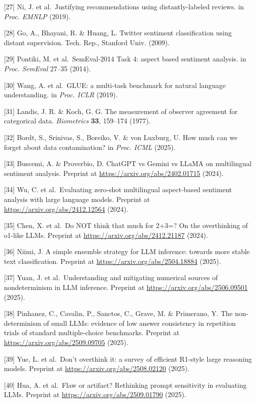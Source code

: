 \documentclass[11pt]{article}
\begin{document}
{[}27{]} Ni, J. et al.~Justifying recommendations using
distantly-labeled reviews. in \emph{Proc. EMNLP} (2019).

{[}28{]} Go, A., Bhayani, R. \& Huang, L. Twitter sentiment
classification using distant supervision. Tech. Rep., Stanford Univ.
(2009).

{[}29{]} Pontiki, M. et al.~SemEval-2014 Task 4: aspect based sentiment
analysis. in \emph{Proc. SemEval} 27--35 (2014).

{[}30{]} Wang, A. et al.~GLUE: a multi-task benchmark for natural
language understanding. in \emph{Proc. ICLR} (2019).

{[}31{]} Landis, J. R. \& Koch, G. G. The measurement of observer
agreement for categorical data. \emph{Biometrics} \textbf{33}, 159--174
(1977).

{[}32{]} Bordt, S., Srinivas, S., Boreiko, V. \& von Luxburg, U. How
much can we forget about data contamination? in \emph{Proc. ICML}
(2025).

{[}33{]} Buscemi, A. \& Proverbio, D. ChatGPT vs Gemini vs LLaMA on
multilingual sentiment analysis. Preprint at
\url{https://arxiv.org/abs/2402.01715} (2024).

{[}34{]} Wu, C. et al.~Evaluating zero-shot multilingual aspect-based
sentiment analysis with large language models. Preprint at
\url{https://arxiv.org/abs/2412.12564} (2024).

{[}35{]} Chen, X. et al.~Do NOT think that much for 2+3=? On the
overthinking of o1-like LLMs. Preprint at
\url{https://arxiv.org/abs/2412.21187} (2024).

{[}36{]} Niimi, J. A simple ensemble strategy for LLM inference: towards
more stable text classification. Preprint at
\url{https://arxiv.org/abs/2504.18884} (2025).

{[}37{]} Yuan, J. et al.~Understanding and mitigating numerical sources
of nondeterminism in LLM inference. Preprint at
\url{https://arxiv.org/abs/2506.09501} (2025).

{[}38{]} Pinhanez, C., Cavalin, P., Sanctos, C., Grave, M. \& Primerano,
Y. The non-determinism of small LLMs: evidence of low answer consistency
in repetition trials of standard multiple-choice benchmarks. Preprint at
\url{https://arxiv.org/abs/2509.09705} (2025).

{[}39{]} Yue, L. et al.~Don't overthink it: a survey of efficient
R1-style large reasoning models. Preprint at
\url{https://arxiv.org/abs/2508.02120} (2025).

{[}40{]} Hua, A. et al.~Flaw or artifact? Rethinking prompt sensitivity
in evaluating LLMs. Preprint at \url{https://arxiv.org/abs/2509.01790} (2025).
\end{document}
